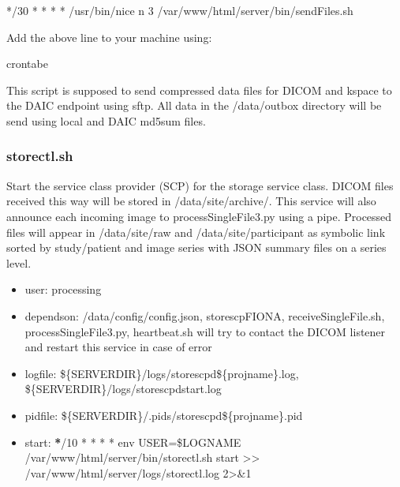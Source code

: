 \documentclass[letterpaper,10pt,english]{sphinxmanual}
\begin{document}
\begin{sphinxVerbatim}[commandchars=\\\{\}]
*/30 * * * * /usr/bin/nice \PYGZhy{}n 3 /var/www/html/server/bin/sendFiles.sh
\end{sphinxVerbatim}

\sphinxAtStartPar
Add the above line to your machine using:

\begin{sphinxVerbatim}[commandchars=\\\{\}]
\PYGZgt{}crontab\PYGZhy{}e
\end{sphinxVerbatim}

\sphinxAtStartPar
This script is supposed to send compressed data files for DICOM and k\sphinxhyphen{}space to the DAIC endpoint using sftp. All data in the /data/outbox directory will be send using local and DAIC md5sum files.

\sphinxstepscope


\subsubsection{storectl.sh}
\label{\detokenize{Architecture/scripts/storectl:storectl-sh}}\label{\detokenize{Architecture/scripts/storectl::doc}}
\sphinxAtStartPar
Start the service class provider (SCP) for the storage service class. DICOM files received this way will be stored in /data/site/archive/. This service will also announce each incoming image to processSingleFile3.py using a pipe. Processed files will appear in /data/site/raw and /data/site/participant as symbolic link sorted by study/patient and image series with JSON summary files on a series level.
\begin{itemize}
\item {} 
\sphinxAtStartPar
user: processing

\item {} 
\sphinxAtStartPar
depends\sphinxhyphen{}on:
\sphinxhyphen{} /data/config/config.json,
\sphinxhyphen{} storescpFIONA,
\sphinxhyphen{} receiveSingleFile.sh,
\sphinxhyphen{} processSingleFile3.py,
\sphinxhyphen{} heartbeat.sh will try to contact the DICOM listener and restart this service in case of error

\item {} 
\sphinxAtStartPar
log\sphinxhyphen{}file:
\sphinxhyphen{} \$\{SERVERDIR\}/logs/storescpd\$\{projname\}.log,
\sphinxhyphen{} \$\{SERVERDIR\}/logs/storescpd\sphinxhyphen{}start.log

\item {} 
\sphinxAtStartPar
pid\sphinxhyphen{}file: \$\{SERVERDIR\}/.pids/storescpd\$\{projname\}.pid

\item {} 
\sphinxAtStartPar
start:
{\color{red}\bfseries{}*}/10 * * * * env USER=\$LOGNAME /var/www/html/server/bin/storectl.sh start \textgreater{}\textgreater{} /var/www/html/server/logs/storectl.log 2\textgreater{}\&1

\end{itemize}
\end{document}
